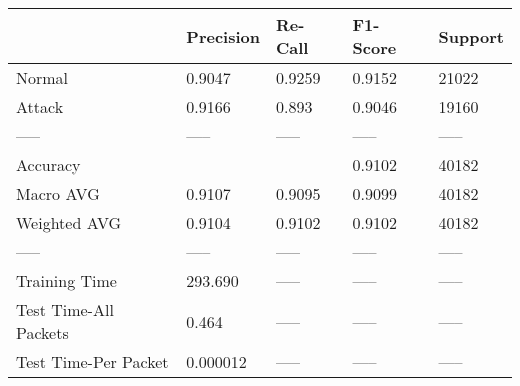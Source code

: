 \begin{tabular}{lllll}
\toprule
{} & Precision & Re-Call & F1-Score & Support \\
\midrule
Normal                &    0.9047 &  0.9259 &   0.9152 &   21022 \\
Attack                &    0.9166 &   0.893 &   0.9046 &   19160 \\
-----                 &     ----- &   ----- &    ----- &   ----- \\
Accuracy              &           &         &   0.9102 &   40182 \\
Macro AVG             &    0.9107 &  0.9095 &   0.9099 &   40182 \\
Weighted AVG          &    0.9104 &  0.9102 &   0.9102 &   40182 \\
-----                 &     ----- &   ----- &    ----- &   ----- \\
Training Time         &   293.690 &   ----- &    ----- &   ----- \\
Test Time-All Packets &     0.464 &   ----- &    ----- &   ----- \\
Test Time-Per Packet  &  0.000012 &   ----- &    ----- &   ----- \\
\bottomrule
\end{tabular}
